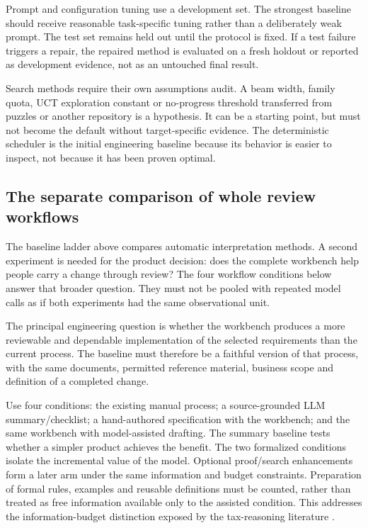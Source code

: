 \documentclass[12pt,a4paper,oneside,openany]{book}
\begin{document}
Prompt and configuration tuning use a development set. The strongest baseline
should receive reasonable task-specific tuning rather than a deliberately weak
prompt. The test set remains held out until the protocol is fixed. If a test
failure triggers a repair, the repaired method is evaluated on a fresh holdout or
reported as development evidence, not as an untouched final result.

Search methods require their own assumptions audit. A beam width, family quota,
UCT exploration constant or no-progress threshold transferred from puzzles or
another repository is a hypothesis. It can be a starting point, but must not
become the default without target-specific evidence. The deterministic scheduler
is the initial engineering baseline because its behavior is easier to inspect,
not because it has been proven optimal.

\subsection{The separate comparison of whole review workflows}

The baseline ladder above compares automatic interpretation methods. A second
experiment is needed for the product decision: does the complete workbench help
people carry a change through review? The four workflow conditions below answer
that broader question. They must not be pooled with repeated model calls as if
both experiments had the same observational unit.


\label{merge:P-04-prototype:04}


The principal engineering question is whether the workbench produces a more
reviewable and dependable implementation of the selected requirements than the
current process. The baseline must therefore be a faithful version of that
process, with the same documents, permitted reference material, business scope and
definition of a completed change.

Use four conditions: the existing manual process; a source-grounded LLM
summary/checklist; a hand-authored specification with the workbench; and the same
workbench with model-assisted drafting. The summary baseline tests whether a
simpler product achieves the benefit. The two formalized conditions isolate the
incremental value of the model. Optional proof/search enhancements form a later
arm under the same information and budget constraints. Preparation of formal
rules, examples and reusable definitions must be counted, rather than treated as
free information available only to the assisted condition. This addresses the
information-budget distinction exposed by the tax-reasoning literature
\citep{jurayj2026}.
\end{document}
